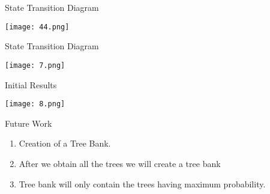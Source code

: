 \documentclass{beamer}
\begin{document}
\begin{frame}{State Transition Diagram}
\begin{center}
	\texttt{[image: 44.png]}	
\end{center}
\end{frame}


\begin{frame}{State Transition Diagram}
\begin{center}
	\texttt{[image: 7.png]}	
\end{center}
\end{frame}



\begin{frame}{Initial Results}
\begin{center}
	\texttt{[image: 8.png]}	
\end{center}
\end{frame}






\begin{frame}{Future Work}
\begin{enumerate}	
	\item Creation of a Tree Bank.  
	\vspace{1em}
	\item After we obtain all the trees we will create a tree bank
	\vspace{1em}
	\item Tree bank will only contain the trees having maximum probability.
\end{enumerate}
\end{frame}
\end{document}
